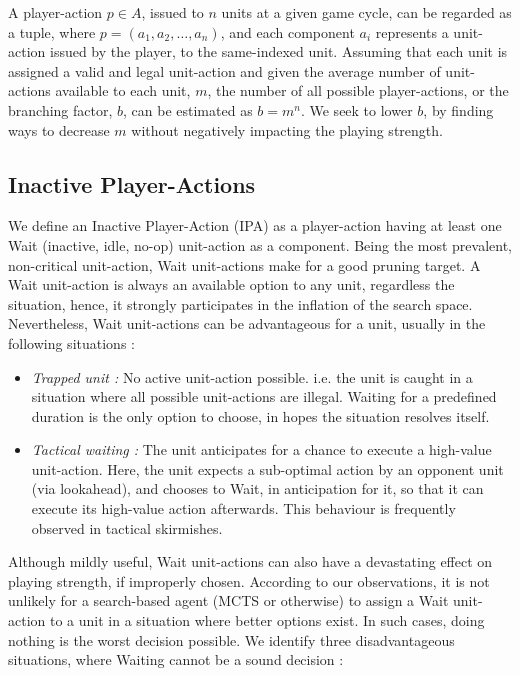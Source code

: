 \documentclass[conference]{IEEEtran}
\begin{document}
A player-action $p \in A$, issued to $n$ units at a given game cycle, can be regarded as a tuple, where $p = (a_1, a_2, \dots, a_n)$, and each component $a_i$ represents a unit-action issued by the player, to the same-indexed unit. Assuming that each unit is assigned a valid and legal unit-action and given the average number of unit-actions available to each unit, $m$, the number of all possible player-actions, or the branching factor, $b$, can be estimated as $b = m^n$. We seek to lower $b$, by finding ways to decrease $m$ without negatively impacting the playing strength.

\subsection{Inactive Player-Actions}

We define an Inactive Player-Action (IPA) as a player-action having at least one Wait (inactive, idle, no-op) unit-action as a component. Being the most prevalent, non-critical unit-action, Wait unit-actions make for a good pruning target. A Wait unit-action is always an available option to any unit, regardless the situation, hence, it strongly participates in the inflation of the search space. Nevertheless, Wait unit-actions can be advantageous for a unit, usually in the following situations :

\begin{itemize}
\item \textit{Trapped unit :} No active unit-action possible. i.e. the unit is caught in a situation where all possible unit-actions are illegal. Waiting for a predefined duration is the only option to choose, in hopes the situation resolves itself.
\item \textit{Tactical waiting :} The unit anticipates for a chance to execute a high-value unit-action. Here, the unit expects a sub-optimal action by an opponent unit (via lookahead), and chooses to Wait, in anticipation for it, so that it can execute its high-value action afterwards. This behaviour is frequently observed in tactical skirmishes.
\end{itemize}

Although mildly useful, Wait unit-actions can also have a devastating effect on playing strength, if improperly chosen. According to our observations, it is not unlikely for a search-based agent (MCTS or otherwise) to assign a Wait unit-action to a unit in a situation where better options exist. In such cases, doing nothing is the worst decision possible. We identify three disadvantageous situations, where Waiting cannot be a sound decision :
\end{document}
